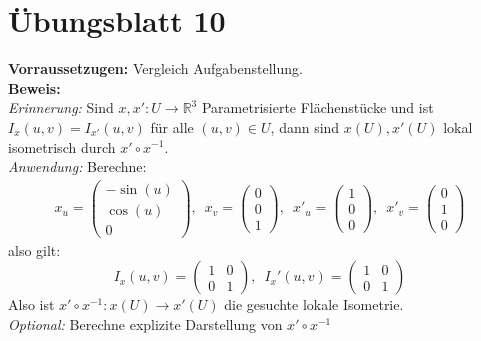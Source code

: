 %
\section{Übungsblatt 10}

\begin{problem}[1]
  \textbf{Vorraussetzugen:} Vergleich Aufgabenstellung. \\
  \textbf{Beweis:} \\
  \emph{Erinnerung:} Sind \( x, x': U \to \mathbb{R}^3 \) Parametrisierte Flächenstücke und ist \( I_x(u,v) = I_{x'}(u,v) \) für alle \( (u,v) \in U \), dann sind \( x(U), x'(U) \) lokal isometrisch durch \( x' \circ x^{-1} \). \\
  \emph{Anwendung:} Berechne: \\
  \begin{align*}
    x_u = \begin{pmatrix}	
      -\sin(u) \\ \cos(u) \\ 0	
    \end{pmatrix},\enspace
    x_v = \begin{pmatrix}	
      0 \\ 0 \\ 1	
    \end{pmatrix},\enspace
		{x'}_u = \begin{pmatrix}	
      1 \\ 0 \\ 0	
    \end{pmatrix},\enspace
    {x'}_v= \begin{pmatrix}	
      0 \\ 1 \\ 0	
    \end{pmatrix}
  \end{align*}
  also gilt:
  \begin{equation*}
    I_x(u,v) = \begin{pmatrix}
      1 & 0 \\
      0 & 1
    \end{pmatrix}, \enspace
		I_x'(u,v) = \begin{pmatrix}
      1 & 0 \\
      0 & 1
    \end{pmatrix}
  \end{equation*}
  Also ist \( x' \circ x^{-1}: x(U) \to x'(U) \) die gesuchte lokale Isometrie. \\
  \emph{Optional:} Berechne explizite Darstellung von \( x' \circ x^{-1} \)
\end{problem}

